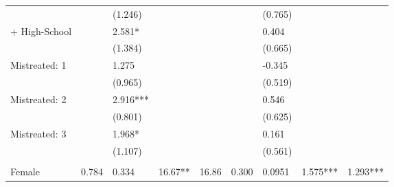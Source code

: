 \begin{tabular}{lrrrrrrrr}
      & \multicolumn{1}{l}{} & \multicolumn{1}{l}{(1.246)} & \multicolumn{1}{l}{} & \multicolumn{1}{l}{} & \multicolumn{1}{l}{} & \multicolumn{1}{l}{(0.765)} & \multicolumn{1}{l}{} & \multicolumn{1}{l}{} \\
+ High-School & \multicolumn{1}{l}{} & \multicolumn{1}{l}{2.581*} & \multicolumn{1}{l}{} & \multicolumn{1}{l}{} & \multicolumn{1}{l}{} & \multicolumn{1}{l}{0.404} & \multicolumn{1}{l}{} & \multicolumn{1}{l}{} \\
      & \multicolumn{1}{l}{} & \multicolumn{1}{l}{(1.384)} & \multicolumn{1}{l}{} & \multicolumn{1}{l}{} & \multicolumn{1}{l}{} & \multicolumn{1}{l}{(0.665)} & \multicolumn{1}{l}{} & \multicolumn{1}{l}{} \\
Mistreated: 1 & \multicolumn{1}{l}{} & \multicolumn{1}{l}{1.275} & \multicolumn{1}{l}{} & \multicolumn{1}{l}{} & \multicolumn{1}{l}{} & \multicolumn{1}{l}{-0.345} & \multicolumn{1}{l}{} & \multicolumn{1}{l}{} \\
      & \multicolumn{1}{l}{} & \multicolumn{1}{l}{(0.965)} & \multicolumn{1}{l}{} & \multicolumn{1}{l}{} & \multicolumn{1}{l}{} & \multicolumn{1}{l}{(0.519)} & \multicolumn{1}{l}{} & \multicolumn{1}{l}{} \\
Mistreated: 2 & \multicolumn{1}{l}{} & \multicolumn{1}{l}{2.916***} & \multicolumn{1}{l}{} & \multicolumn{1}{l}{} & \multicolumn{1}{l}{} & \multicolumn{1}{l}{0.546} & \multicolumn{1}{l}{} & \multicolumn{1}{l}{} \\
      & \multicolumn{1}{l}{} & \multicolumn{1}{l}{(0.801)} & \multicolumn{1}{l}{} & \multicolumn{1}{l}{} & \multicolumn{1}{l}{} & \multicolumn{1}{l}{(0.625)} & \multicolumn{1}{l}{} & \multicolumn{1}{l}{} \\
Mistreated: 3 & \multicolumn{1}{l}{} & \multicolumn{1}{l}{1.968*} & \multicolumn{1}{l}{} & \multicolumn{1}{l}{} & \multicolumn{1}{l}{} & \multicolumn{1}{l}{0.161} & \multicolumn{1}{l}{} & \multicolumn{1}{l}{} \\
      & \multicolumn{1}{l}{} & \multicolumn{1}{l}{(1.107)} & \multicolumn{1}{l}{} & \multicolumn{1}{l}{} & \multicolumn{1}{l}{} & \multicolumn{1}{l}{(0.561)} & \multicolumn{1}{l}{} & \multicolumn{1}{l}{} \\
      & \multicolumn{1}{l}{} & \multicolumn{1}{l}{} & \multicolumn{1}{l}{} & \multicolumn{1}{l}{} & \multicolumn{1}{l}{} & \multicolumn{1}{l}{} & \multicolumn{1}{l}{} & \multicolumn{1}{l}{} \\
Female & \multicolumn{1}{l}{0.784} & \multicolumn{1}{l}{0.334} & \multicolumn{1}{l}{16.67**} & \multicolumn{1}{l}{16.86} & \multicolumn{1}{l}{0.300} & \multicolumn{1}{l}{0.0951} & \multicolumn{1}{l}{1.575***} & \multicolumn{1}{l}{1.293***} \\

\end{tabular}
